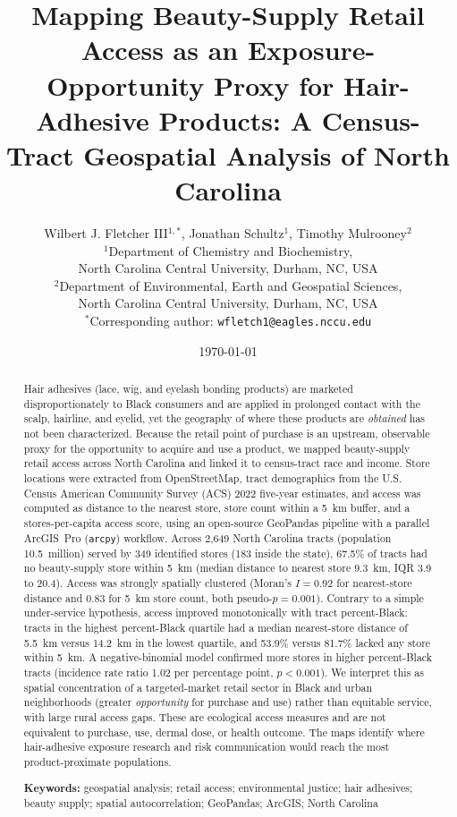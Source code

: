 \documentclass[12pt,letterpaper]{article}
\title{Mapping Beauty-Supply Retail Access as an Exposure-Opportunity Proxy
for Hair-Adhesive Products: A Census-Tract Geospatial Analysis of
North Carolina}
\author{
  Wilbert J. Fletcher III$^{1,*}$,
  Jonathan Schultz$^{1}$,
  Timothy Mulrooney$^{2}$ \\[6pt]
  {\small $^{1}$Department of Chemistry and Biochemistry,} \\
  {\small North Carolina Central University, Durham, NC, USA} \\[2pt]
  {\small $^{2}$Department of Environmental, Earth and Geospatial Sciences,} \\
  {\small North Carolina Central University, Durham, NC, USA} \\[2pt]
  {\small $^{*}$Corresponding author: \texttt{wfletch1@eagles.nccu.edu}}
}
\date{\today}
\begin{document}
\maketitle

\begin{abstract}
\noindent Hair adhesives (lace, wig, and eyelash bonding products) are marketed
disproportionately to Black consumers and are applied in prolonged contact with
the scalp, hairline, and eyelid, yet the geography of where these products are
\emph{obtained} has not been characterized. Because the retail point of purchase
is an upstream, observable proxy for the opportunity to acquire and use a product,
we mapped beauty-supply retail access across North Carolina and linked it to
census-tract race and income. Store locations were extracted from OpenStreetMap,
tract demographics from the U.S. Census American Community Survey (ACS) 2022
five-year estimates, and access was computed as distance to the nearest store,
store count within a 5~km buffer, and a stores-per-capita access score, using an
open-source GeoPandas pipeline with a parallel ArcGIS~Pro (\texttt{arcpy})
workflow. Across 2{,}649 North Carolina tracts (population 10.5~million) served by
349 identified stores (183 inside the state), 67.5\% of tracts had no
beauty-supply store within 5~km (median distance to nearest store 9.3~km,
IQR 3.9 to 20.4). Access was strongly
spatially clustered (Moran's $I = 0.92$ for nearest-store distance and $0.83$ for
5~km store count, both pseudo-$p = 0.001$). Contrary to a simple under-service
hypothesis, access improved monotonically with tract percent-Black: tracts in the
highest percent-Black quartile had a median nearest-store distance of 5.5~km
versus 14.2~km in the lowest quartile, and 53.9\% versus 81.7\% lacked any store
within 5~km. A negative-binomial model confirmed more stores in higher
percent-Black tracts (incidence rate ratio 1.02 per percentage point,
$p < 0.001$). We interpret this as spatial concentration of a targeted-market
retail sector in Black and urban neighborhoods (greater \emph{opportunity} for
purchase and use) rather than equitable service, with large rural access gaps.
These are ecological access measures and are not equivalent to purchase, use,
dermal dose, or health outcome. The maps identify where hair-adhesive exposure
research and risk communication would reach the most product-proximate
populations.

\vspace{6pt}
\noindent\textbf{Keywords:} geospatial analysis; retail access; environmental
justice; hair adhesives; beauty supply; spatial autocorrelation; GeoPandas;
ArcGIS; North Carolina
\end{abstract}
\end{document}
